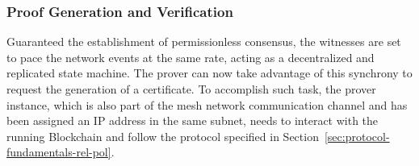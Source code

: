 \subsubsection{Proof Generation and Verification} \label{sec:pol-implementation:proof-generation-verification}

Guaranteed the establishment of permissionless consensus, the witnesses are set to pace the network events at the same rate, acting as a decentralized and replicated state machine. The prover can now take advantage of this synchrony to request the generation of a \pol{} certificate. To accomplish such task, the prover instance, which is also part of the mesh network communication channel and has been assigned an IP address in the same subnet, needs to interact with the running Blockchain and follow the protocol specified in Section~\ref{sec:protocol-fundamentals-rel-pol}. 

